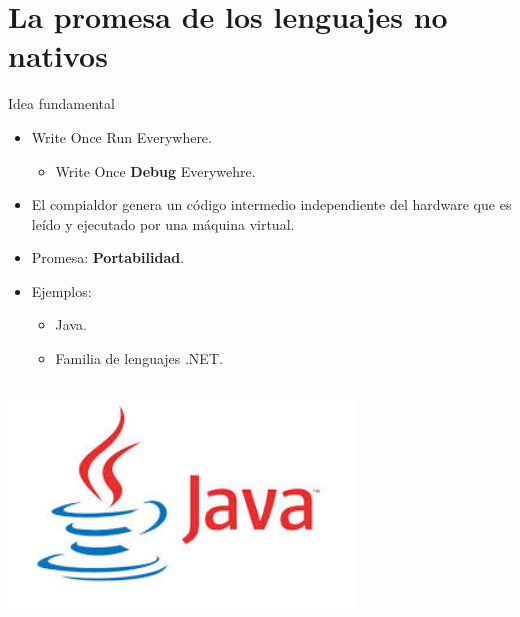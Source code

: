 \section{La promesa de los lenguajes no nativos}

\begin{frame}[t]{Idea fundamental}
  \begin{itemize}
    \item Write Once Run Everywhere.
      \begin{itemize}
        \item Write Once \textbf{\color{red}Debug} Everywehre.
      \end{itemize}
    \item El compialdor genera un código intermedio independiente del hardware que es leído y ejecutado por una máquina virtual.
    \item Promesa: \textbf{\color{blue}Portabilidad}.
    \item Ejemplos:
      \begin{itemize}
        \item Java.
        \item Familia de lenguajes .NET.
      \end{itemize}
  \end{itemize}
\begin{columns}
  \begin{column}{0.2\textwidth}
    \includegraphics[width=0.9\textwidth]{images/java.jpg}
  \end{column}
  \begin{column}{0.1\textwidth}

\end{column}
\end{columns}
\end{frame}
